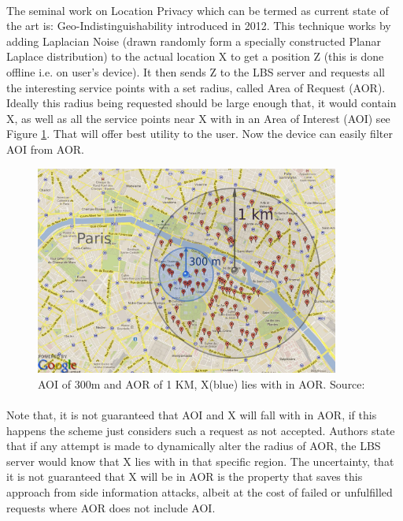 \documentclass[12pt]{report}
\theoremstyle{named}
\begin{document}
\paragraph{}
The seminal work on Location Privacy which can be termed as current state of the art is: Geo-Indistinguishability \cite{andres2013geo} introduced in 2012. This technique works by adding Laplacian Noise (drawn randomly form a specially constructed Planar Laplace distribution) to the actual location X to get a position Z (this is done offline i.e. on user's device). It then sends Z to the LBS server and requests all the interesting service points with a set radius, called Area of Request (AOR). Ideally this radius being requested should be large enough that, it would contain X, as well as all the service points near X with in an Area of Interest (AOI) see Figure \ref{fig:AOIvsAOR}. That will offer best utility to the user. Now the device can easily filter AOI from AOR.
\begin{figure}[ht]
\centering
        \includegraphics[width=100mm,scale=1]{Images/AOIvsAOR.PNG}
    \caption{AOI of 300m and AOR of 1 KM, X(blue) lies with in AOR. Source:\cite{andres2013geo}}
    \label{fig:AOIvsAOR}
\end{figure}

\paragraph{}
Note that, it is not guaranteed that  AOI and X will fall with in AOR, if this happens the scheme just considers such a request as not accepted. Authors state that if any attempt is made to dynamically alter the radius of AOR, the LBS server would know that X lies with in that specific region. The uncertainty, that it is not guaranteed that X will be in AOR is the property that saves this approach from side information attacks, albeit at the cost of failed or unfulfilled requests where AOR does not include AOI.
\end{document}
